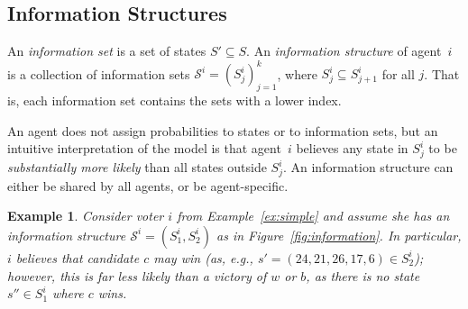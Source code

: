 \documentclass[letterpaper]{article} %
\def\calS{\mathcal{S}}
\newtheorem{example}[theorem]{Example}
\begin{document}
\subsection{Information Structures}
An \emph{information set} is a set of states $S'\subseteq S$. An \emph{information structure} of agent~$i$ is a collection of information sets $\calS^i=(S^i_{j})_{j=1}^k$, where $S^i_j\subseteq S^i_{j+1}$ for all $j$. That is, each information set contains the sets with a lower index.

An agent does not assign probabilities to states or to information sets, but an intuitive interpretation of the model is that agent~$i$ believes any state in $S^i_j$ to be \emph{substantially more likely} than all states outside $S^i_j$. An information structure can either be shared by all agents, or be agent-specific. 
\begin{example}\label{ex:info}
Consider voter $i$ from Example~\ref{ex:simple} and assume she has an information structure $\calS^{i}=(S^{i}_1,S^{i}_2)$ as in Figure~\ref{fig:information}. In particular, $i$ believes that candidate $c$ may win (as, e.g., $s'=(24,21,26,17,6)\in S^i_2$); however, this is far less likely than a victory of $w$ or $b$, as there is no state $s''\in S^i_1$ where $c$ wins.
\end{example} 
\end{document}
